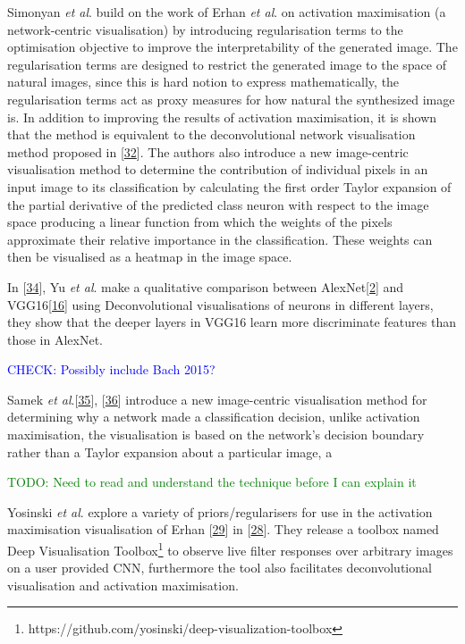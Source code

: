 \documentclass[A4paper,draft]{scrreprt}
\newcommand{\etal}{\textit{et al}.}
\begin{document}
Simonyan \etal{} build on the work of Erhan \etal{} on activation
maximisation (a network-centric visualisation) by introducing
regularisation terms to the optimisation objective to improve the
interpretability of the generated image. The regularisation terms are
designed to restrict the generated image to the space of natural images,
since this is hard notion to express mathematically, the regularisation
terms act as proxy measures for how natural the synthesized image is. In
addition to improving the results of activation maximisation, it is
shown that the method is equivalent to the deconvolutional network
visualisation method proposed in
{[}\protect\hyperlink{ref-zeiler2013_VisualizingUnderstandingConvolutional}{32}{]}.
The authors also introduce a new image-centric visualisation method to
determine the contribution of individual pixels in an input image to its
classification by calculating the first order Taylor expansion of the
partial derivative of the predicted class neuron with respect to the
image space producing a linear function from which the weights of the
pixels approximate their relative importance in the classification.
These weights can then be visualised as a heatmap in the image space.

In
{[}\protect\hyperlink{ref-yu2014_VisualizingComparingConvolutional}{34}{]},
Yu \etal{} make a qualitative comparison between
AlexNet{[}\protect\hyperlink{ref-krizhevsky2012_Imagenetclassificationdeep}{2}{]}
and
VGG16{[}\protect\hyperlink{ref-simonyan2014_VeryDeepConvolutional}{16}{]}
using Deconvolutional visualisations of neurons in different layers,
they show that the deeper layers in VGG16 learn more discriminate
features than those in AlexNet.

\textcolor{blue}{CHECK: Possibly include Bach 2015?}\newline

Samek
\etal{}{[}\protect\hyperlink{ref-samek2015_Evaluatingvisualizationwhat}{35}{]},
{[}\protect\hyperlink{ref-samek2016_EvaluatingVisualizationWhat}{36}{]}
introduce a new image-centric visualisation method for determining why a
network made a classification decision, unlike activation maximisation,
the visualisation is based on the network's decision boundary rather
than a Taylor expansion about a particular image, a

\textcolor{green}{TODO: Need to read and understand the technique before I can explain it}\newline

Yosinski \etal{} explore a variety of priors/regularisers for use in the
activation maximisation visualisation of Erhan
{[}\protect\hyperlink{ref-erhan2009_VisualizingHigherLayerFeatures}{29}{]}
in
{[}\protect\hyperlink{ref-yosinski2015_UnderstandingNeuralNetworks}{28}{]}.
They release a toolbox named Deep Visualisation Toolbox\footnote{https://github.com/yosinski/deep-visualization-toolbox}
to observe live filter responses over arbitrary images on a user
provided CNN, furthermore the tool also facilitates deconvolutional
visualisation and activation maximisation.
\end{document}
